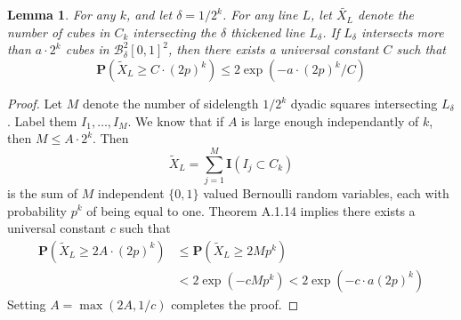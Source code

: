 \documentclass[dvipsnames]{article}
\theoremstyle{plain}
\newtheorem{lemma}{Lemma}
\theoremstyle{plain}
\begin{document}
\begin{lemma}
	For any $k$, and let $\delta = 1/2^k$. For any line $L$, let $\tilde{X_L}$ denote the number of cubes in $C_k$ intersecting the $\delta$ thickened line $L_\delta$. If $L_\delta$ intersects more than $a \cdot 2^k$ cubes in $\mathcal{B}^2_\delta[0,1]^2$, then there exists a universal constant $C$ such that
	\[ \mathbf{P} \left( \tilde{X}_L \geq C \cdot (2p)^k \right) \leq 2 \exp(- a \cdot (2p)^k / C) \]
\end{lemma}
\begin{proof}
	Let $M$ denote the number of sidelength $1/2^k$ dyadic squares intersecting $L_\delta$. Label them $I_1, \dots, I_M$. We know that if $A$ is large enough independantly of $k$, then $M \leq A \cdot 2^k$. Then
	\[ \tilde{X}_L = \sum_{j = 1}^M \mathbf{I}(I_j \subset C_k) \]
	is the sum of $M$ independent $\{ 0, 1 \}$ valued Bernoulli random variables, each with probability $p^k$ of being equal to one. Theorem A.1.14 implies there exists a universal constant $c$ such that
	\begin{align*}
		\mathbf{P} \left( \tilde{X}_L \geq 2A \cdot (2p)^k \right) &\leq \mathbf{P} \left( \tilde{X}_L \geq 2Mp^k \right)\\
		&< 2\exp(- c Mp^k) < 2\exp(- c \cdot a (2p)^k)
	\end{align*}
	Setting $A = \max(2A,1/c)$ completes the proof.







\end{proof}
\end{document}
